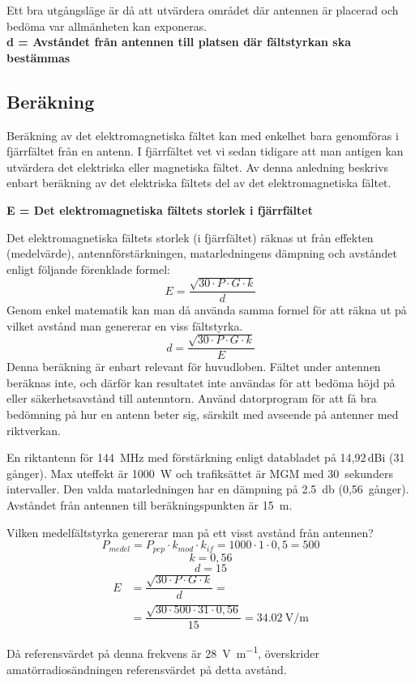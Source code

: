 Ett bra utgångsläge är då att utvärdera området där antennen är placerad och
bedöma var allmänheten kan exponeras.
\\[1ex] %
\noindent\textbf{d = Avståndet från antennen till platsen där fältstyrkan ska bestämmas}

\subsection{Beräkning}

Beräkning av det elektromagnetiska fältet kan med enkelhet bara genomföras i
fjärrfältet från en antenn.
I fjärrfältet vet vi sedan tidigare att man antigen kan utvärdera det elektriska
eller magnetiska fältet.
Av denna anledning beskrivs enbart beräkning av det elektriska fältets del av
det elektromagnetiska fältet. 

\noindent\textbf{E = Det elektromagnetiska fältets storlek i fjärrfältet}

Det elektromagnetiska fältets storlek (i fjärrfältet) räknas ut från
effekten (medelvärde), antennförstärkningen, matarledningens dämpning
och avståndet enligt följande förenklade formel:
\[E=\dfrac{\sqrt{30 \cdot P \cdot G \cdot k}}{d}\]
Genom enkel matematik kan man då använda samma formel för att räkna
ut på vilket avstånd man genererar en viss fältstyrka.
\[d=\dfrac{\sqrt{30 \cdot P \cdot G \cdot k}}{E}\]
Denna beräkning är enbart relevant för huvudloben.
Fältet under antennen beräknas inte, och därför kan resultatet inte användas
för att bedöma höjd på eller säkerhetsavstånd till antenntorn.
Använd datorprogram för att få bra bedömning på hur en antenn beter sig,
särskilt med avseende på antenner med riktverkan.

\begin{exempelbox}
En riktantenn för \qty{144}{\mega\hertz} med förstärkning enligt databladet på
14,92\,dBi (31 gånger).
Max uteffekt är \qty{1000}{\watt} och trafiksättet är MGM med 30~sekunders
intervaller.
Den valda matarledningen har en dämpning på \qty{2,5}{\decibel} (0,56~gånger).
Avståndet från antennen till beräkningspunkten är \qty{15}{\metre}.

Vilken medelfältstyrka genererar man på ett visst avstånd från antennen?
\tcblower
\noindent
\[P_{medel} = P_{pep} \cdot k_{mod} \cdot k_{if}
= 1000 \cdot 1 \cdot 0,5 = 500\]
\[k = 0,56\]
\[d = 15\]
\begin{align*}
  E &= \dfrac{\sqrt{30 \cdot P \cdot G \cdot k}}{d} =\\
&= \dfrac{\sqrt{30 \cdot 500 \cdot 31 \cdot 0,56}}{15}
= \qty{34,02}{\volt\per\metre}
\end{align*}

Då referensvärdet på denna frekvens är \qty{28}{\volt\per\metre}, överskrider
amatörradiosändningen referensvärdet på detta avstånd.
\end{exempelbox}

